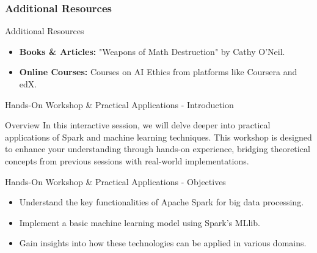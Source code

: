\documentclass[aspectratio=169]{beamer}
\begin{document}
\begin{frame}[fragile]
    \frametitle{Additional Resources}
    \begin{block}{Additional Resources}
        \begin{itemize}
            \item \textbf{Books \& Articles:} "Weapons of Math Destruction" by Cathy O'Neil.
            \item \textbf{Online Courses:} Courses on AI Ethics from platforms like Coursera and edX.
        \end{itemize}
    \end{block}
\end{frame}

\begin{frame}[fragile]{Hands-On Workshop \& Practical Applications - Introduction}
    \begin{block}{Overview}
        In this interactive session, we will delve deeper into practical applications of Spark and machine learning techniques. This workshop is designed to enhance your understanding through hands-on experience, bridging theoretical concepts from previous sessions with real-world implementations.
    \end{block}
\end{frame}

\begin{frame}[fragile]{Hands-On Workshop \& Practical Applications - Objectives}
    \begin{itemize}
        \item Understand the key functionalities of Apache Spark for big data processing.
        \item Implement a basic machine learning model using Spark's MLlib.
        \item Gain insights into how these technologies can be applied in various domains.
    \end{itemize}
\end{frame}
\end{document}
